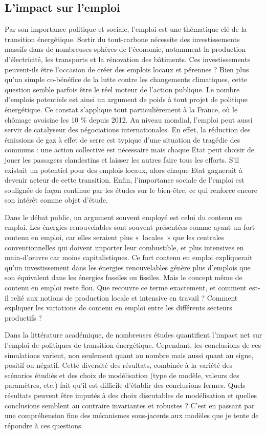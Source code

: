 \subsection{L'impact sur l'emploi}
Par son importance politique et sociale, l'emploi est une thématique clé de la transition énergétique. Sortir du tout-carbone nécessite des investissements massifs dans de nombreuses sphères de l'économie, notamment la production d'électricité, les transports et la rénovation des bâtiments. Ces investissements peuvent-ils être l'occasion de créer des emplois locaux et pérennes ?
Bien plus qu'un simple co-bénéfice de la lutte contre les changements climatiques, cette question semble parfois être le réel moteur de l'action publique. Le nombre d'emplois potentiels est ainsi un argument de poids à tout projet de politique énergétique. Ce constat s'applique tout particulièrement à la France, où le chômage avoisine les 10 \% depuis 2012.
Au niveau mondial, l'emploi peut aussi servir de catalyseur des négociations internationales. En effet, la réduction des émissions de gaz à effet de serre est typique d'une situation de tragédie des communs : une action collective est nécessaire mais chaque Etat peut choisir de jouer les passagers clandestins et laisser les autres faire tous les efforts. S'il existait un potentiel pour des emplois locaux, alors chaque Etat gagnerait à devenir acteur de cette transition. 
Enfin, l'importance sociale de l'emploi est soulignée de façon continue par les études sur le bien-être, ce qui renforce encore son intérêt comme objet d'étude.

Dans le débat public, un argument souvent employé est celui du contenu en emploi. Les énergies renouvelables sont souvent présentées comme ayant un fort contenu en emploi, car elles seraient plus «~locales~» que les centrales conventionnelles qui doivent importer leur combustible, et plus intensives en main-d'\oe{}uvre car moins capitalistiques. Ce fort contenu en emploi expliquerait qu'un investissement dans les énergies renouvelables génère plus d'emplois que son équivalent dans les énergies fossiles ou fissiles. Mais le concept même de contenu en emploi reste flou. Que recouvre ce terme exactement, et comment est-il relié aux notions de production locale et intensive en travail ? Comment expliquer les variations de contenu en emploi entre les différents secteurs productifs ?

Dans la littérature académique, de nombreuses études quantifient l'impact net sur l'emploi de politiques de transition énergétique. Cependant, les conclusions de ces simulations varient, non seulement quant au nombre mais aussi quant au signe, positif ou négatif. Cette diversité des résultats, combinée à la variété des scénarios étudiés et des choix de modélisation (type de modèle, valeurs des paramètres, etc.) fait qu'il est difficile d'établir des conclusions fermes. 
Quels résultats peuvent être imputés à des choix discutables de modélisation et quelles conclusions semblent au contraire invariantes et robustes ? C'est en passant par une compréhension fine des mécanismes sous-jacents aux modèles que je tente de répondre à ces questions.

